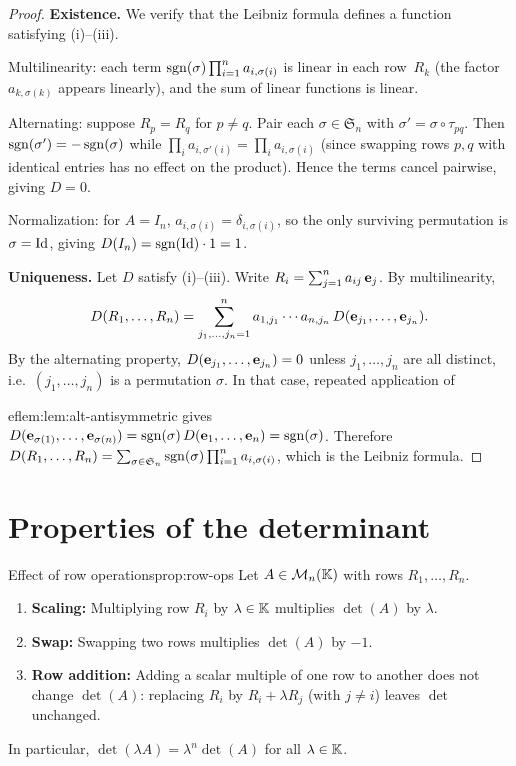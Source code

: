 \begin{proof}
\textbf{Existence.} We verify that the Leibniz formula defines a
function satisfying (i)--(iii).

Multilinearity: each term
$\operatorname{sgn}(\sigma)\prod_{i=1}^n a_{i,\sigma(i)}$ is linear in each
row~$R_k$ (the factor $a_{k,\sigma(k)}$ appears linearly), and the
sum of linear functions is linear.

Alternating: suppose $R_p = R_q$ for $p\neq q$. Pair each
$\sigma\in\mathfrak{S}_n$ with $\sigma'=\sigma\circ\tau_{pq}$.
Then $\operatorname{sgn}(\sigma')=-\operatorname{sgn}(\sigma)$ while
$\prod_i a_{i,\sigma'(i)}=\prod_i a_{i,\sigma(i)}$ (since
swapping rows $p,q$ with identical entries has no effect on the
product). Hence the terms cancel pairwise, giving $D=0$.

Normalization: for $A=I_n$, $a_{i,\sigma(i)}=\delta_{i,\sigma(i)}$,
so the only surviving permutation is $\sigma=\operatorname{Id}$, giving
$D(I_n)=\operatorname{sgn}(\operatorname{Id})\cdot 1 = 1$.

\textbf{Uniqueness.} Let $D$ satisfy (i)--(iii). Write
$R_i = \sum_{j=1}^n a_{ij}\,\mathbf{e}_{j}$. By multilinearity,
\[
  D(R_1,\ldots,R_n)
  = \sum_{j_1,\ldots,j_n=1}^{n}
    a_{1,j_1}\cdots a_{n,j_n}\,D(\mathbf{e}_{j_1},\ldots,\mathbf{e}_{j_n}).
\]
By the alternating property, $D(\mathbf{e}_{j_1},\ldots,\mathbf{e}_{j_n})=0$
unless $j_1,\ldots,j_n$ are all distinct, i.e.\ $(j_1,\ldots,j_n)$
is a permutation $\sigma$. In that case, repeated application of

ef{lem:lem:alt-antisymmetric} gives
$D(\mathbf{e}_{\sigma(1)},\ldots,\mathbf{e}_{\sigma(n)})
= \operatorname{sgn}(\sigma)\,D(\mathbf{e}_{1},\ldots,\mathbf{e}_{n})
= \operatorname{sgn}(\sigma)$.
Therefore $D(R_1,\ldots,R_n) = \sum_{\sigma\in\mathfrak{S}_n}
\operatorname{sgn}(\sigma)\prod_{i=1}^n a_{i,\sigma(i)}$, which is the Leibniz
formula.
\end{proof}


\section{Properties of the determinant}\label{sec:det-properties}

\begin{proposition}{Effect of row operations}{prop:row-ops}
Let $A\in\mathcal{M}_n({\mathbb{K}})$ with rows $R_1,\ldots,R_n$.
\begin{enumerate}[label=(\roman*)]
  \item \textbf{Scaling:} Multiplying row $R_i$ by $\lambda\in{\mathbb{K}}$
    multiplies $\det(A)$ by $\lambda$.
  \item \textbf{Swap:} Swapping two rows multiplies $\det(A)$ by $-1$.
  \item \textbf{Row addition:} Adding a scalar multiple of one row to
    another does not change $\det(A)$:
    replacing $R_i$ by $R_i + \lambda R_j$ (with $j\neq i$) leaves
    $\det$ unchanged.
\end{enumerate}
In particular, $\det(\lambda A)=\lambda^n\det(A)$ for all
$\lambda\in{\mathbb{K}}$.
\end{proposition}

